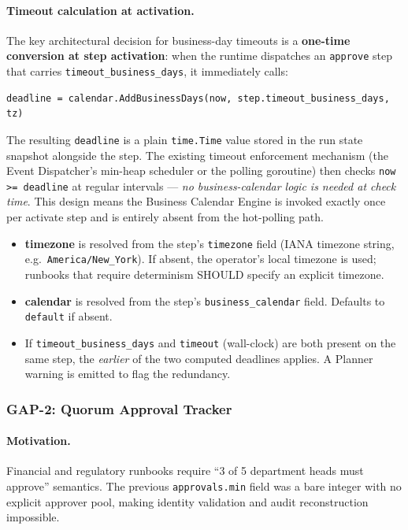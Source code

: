 \paragraph{Timeout calculation at activation.}
The key architectural decision for business-day timeouts is a \textbf{one-time conversion
at step activation}: when the runtime dispatches an \texttt{approve} step that carries
\texttt{timeout\_business\_days}, it immediately calls:

\begin{verbatim}
deadline = calendar.AddBusinessDays(now, step.timeout_business_days, tz)
\end{verbatim}

The resulting \texttt{deadline} is a plain \texttt{time.Time} value stored in the run
state snapshot alongside the step. The existing timeout enforcement mechanism (the
Event Dispatcher's min-heap scheduler or the polling goroutine) then checks
\texttt{now >= deadline} at regular intervals — \emph{no business-calendar logic is
needed at check time}. This design means the Business Calendar Engine is invoked
exactly once per activate step and is entirely absent from the hot-polling path.

\begin{itemize}
  \item \textbf{timezone} is resolved from the step's \texttt{timezone} field (IANA
        timezone string, e.g.\ \texttt{America/New\_York}). If absent, the operator's
        local timezone is used; runbooks that require determinism SHOULD specify an
        explicit timezone.
  \item \textbf{calendar} is resolved from the step's \texttt{business\_calendar} field.
        Defaults to \texttt{default} if absent.
  \item If \texttt{timeout\_business\_days} and \texttt{timeout} (wall-clock) are both
        present on the same step, the \emph{earlier} of the two computed deadlines
        applies. A Planner warning is emitted to flag the redundancy.
\end{itemize}

\subsubsection*{GAP-2: Quorum Approval Tracker}
\label{sec:quorum_tracker}

\paragraph{Motivation.}
Financial and regulatory runbooks require ``3 of 5 department heads must approve''
semantics. The previous \texttt{approvals.min} field was a bare integer with no explicit
approver pool, making identity validation and audit reconstruction impossible.

